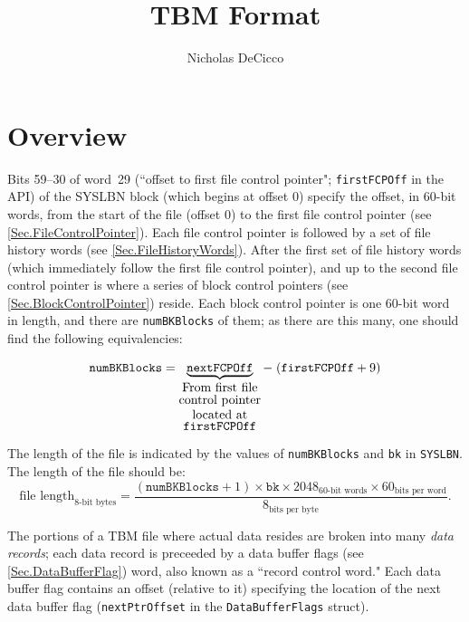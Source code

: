 \documentclass{report}
\begin{document}
\title{TBM Format}
\author{Nicholas DeCicco}
\maketitle

\chapter{Overview}

Bits 59--30 of word~29 (``offset to first file control pointer"; \texttt{firstFCPOff} in the API) of the SYSLBN block (which begins at offset 0) specify the offset, in 60-bit words, from the start of the file (offset 0) to the first file control pointer (see \cref{Sec.FileControlPointer}). Each file control pointer is followed by a set of file history words (see \cref{Sec.FileHistoryWords}). After the first set of file history words (which immediately follow the first file control pointer), and up to the second file control pointer is where a series of block control pointers (see \cref{Sec.BlockControlPointer}) reside. Each block control pointer is one 60-bit word in length, and there are \texttt{numBKBlocks} of them; as there are this many, one should find the following equivalencies:

\begin{align*}
	\mathtt{numBKBlocks} =
	\underbrace{\mathtt{nextFCPOff}}_{\shortstack[c]{
		From first file\\
		control pointer\\
		located at\\
		\texttt{firstFCPOff}
	}} - \; (\mathtt{firstFCPOff} + 9)
\end{align*}

The length of the file is indicated by the values of \texttt{numBKBlocks} and \texttt{bk} in \texttt{SYSLBN}. The length of the file should be:
\[
	\text{file length}_\text{8-bit bytes} = \dfrac{(\texttt{numBKBlocks} + 1) \times \texttt{bk} \times 2048_\text{60-bit words} \times 60_\text{bits per word}}{8_\text{bits per byte}} \mathrm{.}
\]

The portions of a TBM file where actual data resides are broken into many \textit{data records}; each data record is preceeded by a data buffer flags (see \cref{Sec.DataBufferFlag}) word, also known as a ``record control word." Each data buffer flag contains an offset (relative to it) specifying the location of the next data buffer flag (\texttt{nextPtrOffset} in the \texttt{DataBufferFlags} struct).
\end{document}
